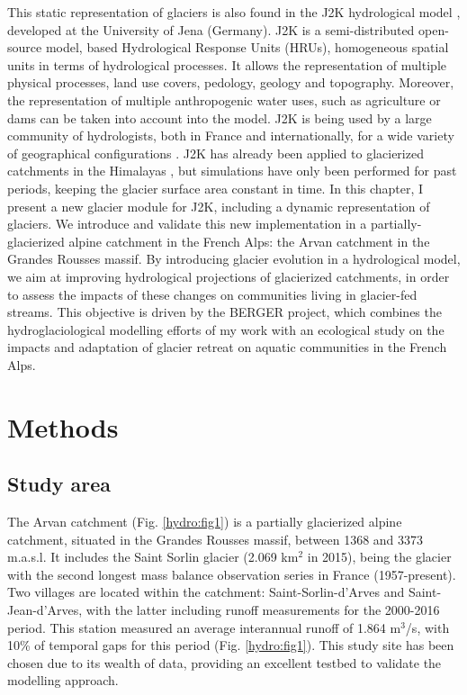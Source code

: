 This static representation of glaciers is also found in the J2K hydrological model \citep{krause_quantifying_2002}, developed at the University of Jena (Germany). J2K is a semi-distributed open-source model, based Hydrological Response Units (HRUs), homogeneous spatial units in terms of hydrological processes. It allows the representation of multiple physical processes, land use covers, pedology, geology and topography. Moreover, the representation of multiple anthropogenic water uses, such as agriculture or dams can be taken into account into the model.  J2K is being used by a large community of hydrologists, both in France and internationally, for a wide variety of geographical configurations \citep{krause_quantifying_2002, nepal_understanding_2014, braud_j2000-rhone_2017}. J2K has already been applied to glacierized catchments in the Himalayas \citep{nepal_understanding_2014}, but simulations have only been performed for past periods, keeping the glacier surface area constant in time. In this chapter, I present a new glacier module for J2K, including a dynamic representation of glaciers. We introduce and validate this new implementation in a partially-glacierized alpine catchment in the French Alps: the Arvan catchment in the Grandes Rousses massif. By introducing glacier evolution in a hydrological model, we aim at improving hydrological projections of glacierized catchments, in order to assess the impacts of these changes on communities living in glacier-fed streams. This objective is driven by the BERGER project, which combines the hydroglaciological modelling efforts of my work with an ecological study on the impacts and adaptation of glacier retreat on aquatic communities in the French Alps.

\section{Methods}

\subsection{Study area}

The Arvan catchment (Fig. \ref{hydro:fig1}) is a partially glacierized alpine catchment, situated in the Grandes Rousses massif, between 1368 and 3373 m.a.s.l. It includes the Saint Sorlin glacier (2.069 km$^{2}$ in 2015), being the glacier with the second longest mass balance observation series in France (1957-present). Two villages are located within the catchment: Saint-Sorlin-d'Arves and Saint-Jean-d'Arves, with the latter including runoff measurements for the 2000-2016 period. This station measured an average interannual runoff of 1.864 m$^{3}$/s, with 10\% of temporal gaps for this period (Fig. \ref{hydro:fig1}). This study site has been chosen due to its wealth of data, providing an excellent testbed to validate the modelling approach.

